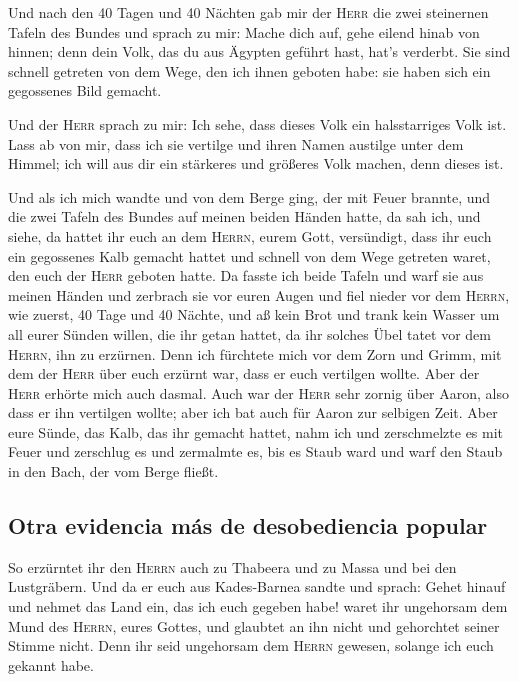  Und nach den 40 Tagen und 40 Nächten gab mir der
\textsc{Herr} die zwei steinernen Tafeln des Bundes  und
sprach zu mir: Mache dich auf, gehe eilend hinab von hinnen; denn dein
Volk, das du aus Ägypten geführt hast, hat's verderbt. Sie sind schnell
getreten von dem Wege, den ich ihnen geboten habe: sie haben sich ein
gegossenes Bild gemacht.

 Und der \textsc{Herr} sprach zu mir: Ich sehe, dass
dieses Volk ein halsstarriges Volk ist.  Lass ab von mir,
dass ich sie vertilge und ihren Namen austilge unter dem Himmel; ich
will aus dir ein stärkeres und größeres Volk machen, denn dieses ist.

 Und als ich mich wandte und von dem Berge ging, der mit
Feuer brannte, und die zwei Tafeln des Bundes auf meinen beiden Händen
hatte,  da sah ich, und siehe, da hattet ihr euch an dem
\textsc{Herrn}, eurem Gott, versündigt, dass ihr euch ein gegossenes
Kalb gemacht hattet und schnell von dem Wege getreten waret, den euch
der \textsc{Herr} geboten hatte.  Da fasste ich beide
Tafeln und warf sie aus meinen Händen und zerbrach sie vor euren Augen
 und fiel nieder vor dem \textsc{Herrn}, wie zuerst, 40
Tage und 40 Nächte, und aß kein Brot und trank kein Wasser um all eurer
Sünden willen, die ihr getan hattet, da ihr solches Übel tatet vor dem
\textsc{Herrn}, ihn zu erzürnen.  Denn ich fürchtete mich
vor dem Zorn und Grimm, mit dem der \textsc{Herr} über euch erzürnt war,
dass er euch vertilgen wollte. Aber der \textsc{Herr} erhörte mich auch
dasmal.  Auch war der \textsc{Herr} sehr zornig über
Aaron, also dass er ihn vertilgen wollte; aber ich bat auch für Aaron
zur selbigen Zeit.  Aber eure Sünde, das Kalb, das ihr
gemacht hattet, nahm ich und zerschmelzte es mit Feuer und zerschlug es
und zermalmte es, bis es Staub ward und warf den Staub in den Bach, der
vom Berge fließt.

\hypertarget{otra-evidencia-muxe1s-de-desobediencia-popular}{%
\subsection{Otra evidencia más de desobediencia
popular}\label{otra-evidencia-muxe1s-de-desobediencia-popular}}

 So erzürntet ihr den \textsc{Herrn} auch zu Thabeera und
zu Massa und bei den Lustgräbern.  Und da er euch aus
Kades-Barnea sandte und sprach: Gehet hinauf und nehmet das Land ein,
das ich euch gegeben habe! waret ihr ungehorsam dem Mund des
\textsc{Herrn}, eures Gottes, und glaubtet an ihn nicht und gehorchtet
seiner Stimme nicht.  Denn ihr seid ungehorsam dem
\textsc{Herrn} gewesen, solange ich euch gekannt habe.


